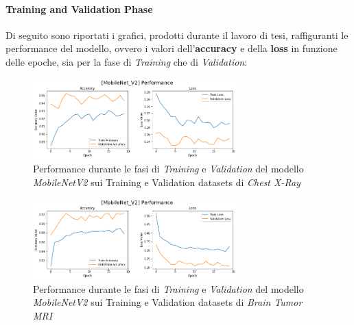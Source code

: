         \paragraph{Training and Validation Phase} 
        Di seguito sono riportati i grafici, prodotti durante il lavoro di tesi, raffiguranti le performance del modello, ovvero i valori dell'\textbf{accuracy} e della \textbf{loss} in funzione delle epoche, sia per la fase di \textit{Training} che di \textit{Validation}:
            \begin{figure}[!h]
                \centering
                \includegraphics[width=0.7\textwidth]{Images/Modelli/MobileNetV2/MobileNetV2 Pneumonia Performance.png}
                \caption{Performance durante le fasi di \textit{Training} e \textit{Validation} del modello \textit{MobileNetV2} sui Training e Validation datasets di \textit{Chest X-Ray}}
                \label{MobileNetV2 Pneumonia Performance}
            \end{figure}
            
            \begin{figure}[!h]
                \centering
                \includegraphics [width=0.7\textwidth]{Images/Modelli/MobileNetV2/MobileNetV2 Brain Performance.png}
                \caption{Performance durante le fasi di \textit{Training} e \textit{Validation} del modello \textit{MobileNetV2} sui Training e Validation datasets di \textit{Brain Tumor MRI}}
                \label{MobileNetV2 Brain Performance}
            \end{figure}
        
